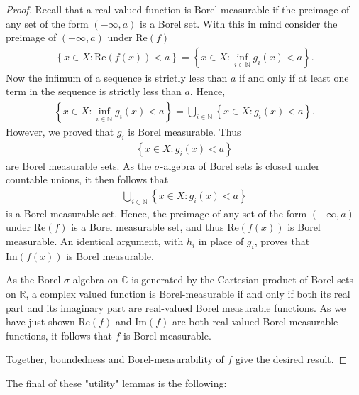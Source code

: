 \begin{proof}
Recall that a real-valued function is Borel measurable if the preimage of any set of the form $(-\infty, a)$ is a Borel set. With this in mind consider the preimage of $(-\infty, a)$ under $\text{Re}(f)$
\begin{align}
    \left\{ x \in X : \text{Re}(f(x)) < a \right\} = \left\{ x \in X : \inf_{i \in \mathbb{N}} g_i(x) < a \right\}.
\end{align}
Now the infimum of a sequence is strictly less than $a$ if and only if at least one term in the sequence is strictly less than $a$. Hence,
\begin{align}
    \left\{ x \in X : \inf_{i \in \mathbb{N}} g_i(x) < a \right\} = \bigcup_{i \in \mathbb{N}}  \left\{ x \in X : g_i(x) < a \right\}.
\end{align}
However, we proved that $g_i$ is Borel measurable. Thus
\begin{align}
    \left\{ x \in X : g_i(x) < a \right\}
\end{align}
are Borel measurable sets. As the $\sigma$-algebra of Borel sets is closed under countable unions, it then follows that
\begin{align}
    \bigcup_{i \in \mathbb{N}}  \left\{ x \in X : g_i(x) < a \right\}
\end{align}
is a Borel measurable set. Hence, the preimage of any set of the form $(-\infty, a)$ under $\text{Re}(f)$ is a Borel measurable set, and thus $\text{Re}(f(x))$ is Borel measurable. An identical argument, with $h_i$ in place of $g_i$, proves that $\text{Im}(f(x))$ is Borel measurable.

As the Borel $\sigma$-algebra on $\mathbb{C}$ is generated by the Cartesian product of Borel sets on $\mathbb{R}$, a complex valued function is Borel-measurable if and only if both its real part and its imaginary part are real-valued Borel measurable functions. As we have just shown $\text{Re}(f)$ and $\text{Im}(f)$ are both real-valued Borel measurable functions, it follows that $f$ is Borel-measurable.

Together, boundedness and Borel-measurability of $f$ give the desired result.
\end{proof}

The final of these "utility" lemmas is the following:

